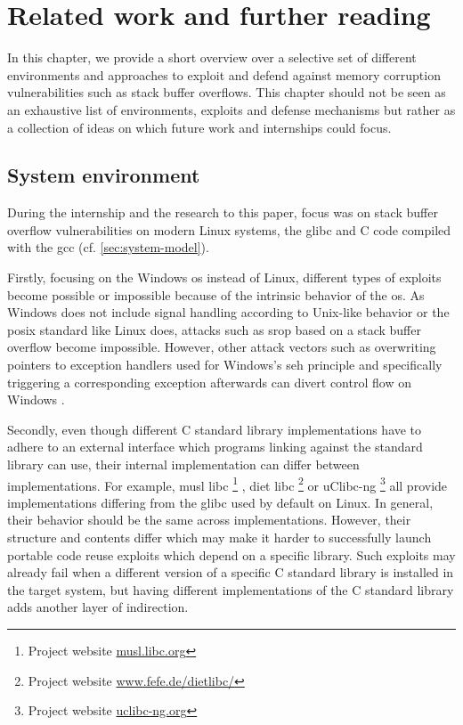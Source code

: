 \chapter{Related work and further reading}
\label{chp:related-work}

In this chapter, we provide a short overview over a selective set of different environments and approaches to exploit and defend against memory corruption vulnerabilities such as stack buffer overflows.
This chapter should not be seen as an exhaustive list of environments, exploits and defense mechanisms but rather as a collection of ideas on which future work and internships could focus.

\section{System environment}
\label{sec:system-environment}

During the internship and the research to this paper, focus was on stack buffer overflow vulnerabilities on modern Linux systems, the \acl{glibc} and C code compiled with the \acl{gcc} (cf. \cref{sec:system-model}).

Firstly, focusing on the Windows \gls{os} instead of Linux, different types of exploits become possible or impossible because of the intrinsic behavior of the \gls{os}.
As Windows does not include signal handling according to Unix-like behavior or the \gls{posix} standard like Linux does, attacks such as \gls{srop} based on a stack buffer overflow become impossible.
However, other attack vectors such as overwriting pointers to exception handlers used for Windows's \gls{seh} principle and specifically triggering a corresponding exception afterwards can divert control flow on Windows \cite{CorelanTeam2009}.

Secondly, even though different C standard library implementations have to adhere to an external interface which programs linking against the standard library can use, their internal implementation can differ between implementations.
For example, musl libc%
	\footnote{Project website \href{https://musl.libc.org}{musl.libc.org}}%
, diet libc%
	\footnote{Project website \href{https://www.fefe.de/dietlibc/}{www.fefe.de/dietlibc/}}
or uClibc-ng%
	\footnote{Project website \href{https://uclibc-ng.org}{uclibc-ng.org}}
all provide implementations differing from the \gls{glibc} used by default on Linux.
In general, their behavior should be the same across implementations.
However, their structure and contents differ which may make it harder to successfully launch portable code reuse exploits which depend on a specific library.
Such exploits may already fail when a different version of a specific C standard library is installed in the target system, but having different implementations of the C standard library adds another layer of indirection.

